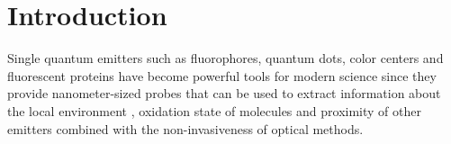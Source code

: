 

\section{Introduction\label{sec:intro}}

%
%
%
%

Single quantum emitters such as fluorophores, quantum dots, color centers 
and fluorescent proteins have become powerful tools for modern science 
since they provide nanometer-sized probes that can be used to extract 
information about the local environment \cite{moerner1999illuminating, kulzer2010single}, 
oxidation state of molecules\cite{zhang2017gold} and proximity of other 
emitters\cite{stein2011single} combined with the non-invasiveness of optical methods. 

